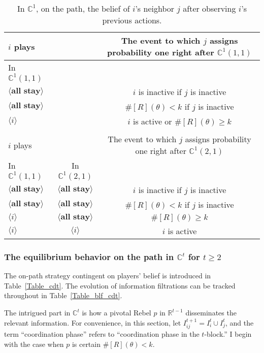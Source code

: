 \documentclass[12pt,letter]{article}
\newcommand{\Kappa}{\mathbb{C}}
\newcommand{\Omicron}{\mathbb{R}}
\theoremstyle{definition}
\theoremstyle{definition}
\theoremstyle{remark}
\theoremstyle{claim}
\begin{document}
\begin{table}[!htbp]
\caption{In $\Kappa^1$, on the path, the belief of $i$'s neighbor $j$ after observing $i$'s previous actions.}
\label{Table_blf_cd0}
\begin{center}
\begin{tabular}{l  c | c}
 	$i$ plays	  			&	  &  The event to which $j$ assigns probability one  right after $\Kappa^1(1,1)$\\
\hline
\hline
In $\Kappa^1(1,1)$	&		&		  \\
\hline
  $\langle \textbf{all stay} \rangle$	& &   $i$ is inactive if $j$ is inactive \\
  $\langle \textbf{all stay} \rangle$	&  &  $\#[R](\theta)< k$ if $j$ is inactive\\
  $\langle i \rangle$	&	&  $i$ is active or $\#[R](\theta)\geq k$    \\
  \hline
  \\
 	$i$ plays	  	&  	  &The event to which $j$ assigns probability one  right after $\Kappa^1(2,1)$\\
\hline
\hline
	In $\Kappa^1(1,1)$		&			In $\Kappa^1(2,1)$	&  \\
\hline
  $\langle \textbf{all stay} \rangle$	&  $\langle \textbf{all stay} \rangle$ &  $i$ is inactive if $j$ is inactive \\
  $\langle \textbf{all stay} \rangle$	&  $\langle \textbf{all stay} \rangle$ &  $\#[R](\theta)< k$ if $j$ is inactive\\
  $\langle i \rangle$	&	$\langle \textbf{all stay} \rangle$ &  $\#[R](\theta)\geq k$    \\
  $\langle i \rangle$	&	$\langle i \rangle$ &  $i$ is active  \\
  \hline
\end{tabular}
\end{center}
\end{table}




\subsubsection{The equilibrium behavior on the path in $\Kappa^t$ for $t\geq 2$}
\label{sec:cdt}
The on-path strategy contingent on players' belief is introduced in Table~\ref{Table_cdt}. The evolution of information filtrations can be tracked throughout in Table~\ref{Table_blf_cdt}. 

The intrigued part in $\Kappa^t$ is how a pivotal Rebel $p$ in $\Omicron^{t-1}$ disseminates the relevant information. For convenience, in this section, let $I^{t+1}_{ij}=I^t_i\cup I^t_j$, and the term ``coordination phase'' refers to ``coordination phase in the $t$-block.'' I begin with the case when $p$ is certain $\#[R](\theta)< k$.
\end{document}
